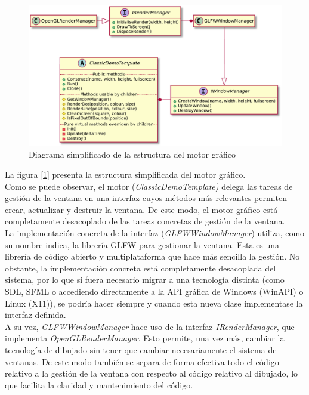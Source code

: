 \begin{figure}[h]
	\centering
	\includegraphics[width=15cm]{archivos/classicdemotemplateuml}
	\caption{Diagrama simplificado de la estructura del motor gráfico}
	\label{fig:classicdemotemplateuml}
\end{figure}

La figura [\ref{fig:classicdemotemplateuml}] presenta la estructura simplificada del motor gráfico.\\

Como se puede observar, el motor (\emph{ClassicDemoTemplate)} delega las tareas de gestión de la ventana en una interfaz cuyos métodos más relevantes permiten crear, actualizar y destruir la ventana. De este modo, el motor gráfico está completamente desacoplado de las tareas concretas de gestión de la ventana.\\

La implementación concreta de la interfaz (\emph{GLFWWindowManager}) utiliza, como su nombre indica, la librería GLFW para gestionar la ventana. Esta es una librería de código abierto y multiplataforma que hace más sencilla la gestión. No obstante, la implementación concreta está completamente desacoplada del sistema, por lo que si fuera necesario migrar a una tecnología distinta (como SDL, SFML o accediendo directamente a la API gráfica de Windows (WinAPI) o Linux (X11)), se podría hacer siempre y cuando esta nueva clase implementase la interfaz definida.\\

A su vez, \emph{GLFWWindowManager} hace uso de la interfaz \emph{IRenderManager}, que implementa \emph{OpenGLRenderManager}. Esto permite, una vez más, cambiar la tecnología de dibujado sin tener que cambiar necesariamente el sistema de ventanas. De este modo también se separa de forma efectiva todo el código relativo a la gestión de la ventana con respecto al código relativo al dibujado, lo que facilita la claridad y mantenimiento del código.\\

